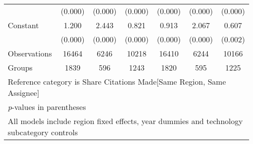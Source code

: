 \begin{sidewaystable}[htbp]
\begin{tabular}{l*{6}{c}}
                &  (0.000)&  (0.000)&  (0.000)&  (0.000)&  (0.000)&  (0.000)\\
Constant        &    1.200&    2.443&    0.821&    0.913&    2.067&    0.607\\
                &  (0.000)&  (0.000)&  (0.000)&  (0.000)&  (0.000)&  (0.002)\\
\hline
Observations    &    16464&     6246&    10218&    16410&     6244&    10166\\
Groups          &     1839&      596&     1243&     1820&      595&     1225\\
\hline\hline
\multicolumn{7}{l}{\footnotesize Reference category is Share Citations Made[Same Region, Same Assignee]}\\
\multicolumn{7}{l}{\footnotesize \textit{p}-values in parentheses}\\
\multicolumn{7}{l}{\footnotesize All models include region fixed effects, year dummies and technology subcategory controls}\\
\end{tabular}
\end{sidewaystable}
